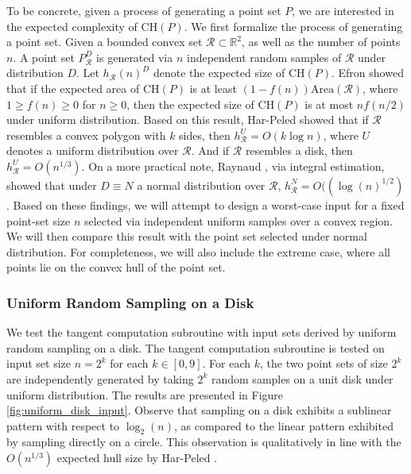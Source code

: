 \documentclass{article}
\newcommand{\figref}[1]{Figure \ref{#1}}
\newcommand{\CH}{\mathrm{CH}}
\begin{document}
To be concrete, given a process of generating a point set $P$, we are interested in the expected complexity of $\CH(P)$. We first formalize the process of generating a point set. Given a bounded convex set $\mathcal{R} \subset \mathbb{R}^2$, as well as the number of points $n$. A point set $P_\mathcal{R}^D$ is generated via $n$ independent random samples of $\mathcal{R}$ under distribution $D$. Let $h_\mathcal{R}(n)^D$ denote the expected size of $\CH(P)$. Efron \cite{efr65} showed that if the expected area of $\CH(P)$ is at least $(1-f(n)) \mathrm{Area}(\mathcal{R})$, where $1 \geq f(n) \geq 0$ for $n \geq 0$, then the expected size of $\CH(P)$ is at most $nf(n/2)$ under uniform distribution. Based on this result, Har-Peled \cite{hp11} showed that if $\mathcal{R}$ resembles a convex polygon with $k$ sides, then $h_\mathcal{R}^U = O(k \log n)$, where $U$ denotes a uniform distribution over $\mathcal{R}$. And if $\mathcal{R}$ resembles a disk, then $h_\mathcal{R}^U = O(n^{1/3})$. On a more practical note, Raynaud \cite{ray70}, via integral estimation, showed that under $D \equiv N$ a normal distribution over $\mathcal{R}$, $h_\mathcal{R}^N = O((\log(n)^{1/2})$. Based on these findings, we will attempt to design a worst-case input for a fixed point-set size $n$ selected via independent uniform samples over a convex region. We will then compare this result with the point set selected under normal distribution. For completeness, we will also include the extreme case, where all points lie on the convex hull of the point set.

\subsubsection{Uniform Random Sampling on a Disk}

We test the tangent computation subroutine with input sets derived by uniform random sampling on a disk. The tangent computation subroutine is tested on input set size $n = 2^k$ for each $k \in [0, 9]$. For each $k$, the two point sets of size $2^k$ are independently generated by taking $2^k$ random samples on a unit disk under uniform distribution. The results are presented in \figref{fig:uniform_disk_input}. Observe that sampling on a disk exhibits a sublinear pattern with respect to $\log_2(n)$, as compared to the linear pattern exhibited by sampling directly on a circle. This observation is qualitatively in line with the $O(n^{1/3})$ expected hull size by Har-Peled \cite{hp11}.
\end{document}
